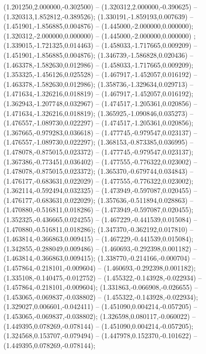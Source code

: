  (1.201250,2.000000,-0.302500) -- (1.320312,2.000000,-0.390625) -- (1.320313,1.852812,-0.389526);
 (1.330191,-1.859193,0.007639) -- (1.451901,-1.856885,0.004876) -- (1.445000,-2.000000,0.000000);
 (1.320312,-2.000000,0.000000) -- (1.445000,-2.000000,0.000000) ;
 (1.339015,-1.721325,0.014463) -- (1.458033,-1.717665,0.009209) -- (1.451901,-1.856885,0.004876);
 (1.346739,-1.586828,0.020436) -- (1.463378,-1.582630,0.012986) -- (1.458033,-1.717665,0.009209);
 (1.353325,-1.456126,0.025528) -- (1.467917,-1.452057,0.016192) -- (1.463378,-1.582630,0.012986);
 (1.358736,-1.329634,0.029713) -- (1.471634,-1.326216,0.018819) -- (1.467917,-1.452057,0.016192);
 (1.362943,-1.207748,0.032967) -- (1.474517,-1.205361,0.020856) -- (1.471634,-1.326216,0.018819);
 (1.365925,-1.090846,0.035273) -- (1.476557,-1.089730,0.022297) -- (1.474517,-1.205361,0.020856);
 (1.367665,-0.979283,0.036618) -- (1.477745,-0.979547,0.023137) -- (1.476557,-1.089730,0.022297);
 (1.368153,-0.873385,0.036995) -- (1.478078,-0.875015,0.023372) -- (1.477745,-0.979547,0.023137);
 (1.367386,-0.773451,0.036402) -- (1.477555,-0.776322,0.023002) -- (1.478078,-0.875015,0.023372);
 (1.365370,-0.679744,0.034843) -- (1.476177,-0.683631,0.022029) -- (1.477555,-0.776322,0.023002);
 (1.362114,-0.592494,0.032325) -- (1.473949,-0.597087,0.020455) -- (1.476177,-0.683631,0.022029);
 (1.357636,-0.511894,0.028863) -- (1.470880,-0.516811,0.018286) -- (1.473949,-0.597087,0.020455);
 (1.352325,-0.436665,0.024255) -- (1.467229,-0.441539,0.015084) -- (1.470880,-0.516811,0.018286);
 (1.347370,-0.362192,0.017810) -- (1.463814,-0.366863,0.009415) -- (1.467229,-0.441539,0.015084);
 (1.342855,-0.288049,0.009486) -- (1.460693,-0.292398,0.001182) -- (1.463814,-0.366863,0.009415);
 (1.338770,-0.214166,-0.000704) -- (1.457864,-0.218101,-0.009604) -- (1.460693,-0.292398,0.001182);
 (1.335108,-0.140475,-0.012752) -- (1.455322,-0.143928,-0.022934) -- (1.457864,-0.218101,-0.009604);
 (1.331863,-0.066908,-0.026655) -- (1.453065,-0.069837,-0.038802) -- (1.455322,-0.143928,-0.022934);
 (1.329027,0.006601,-0.042411) -- (1.451090,0.004214,-0.057205) -- (1.453065,-0.069837,-0.038802);
 (1.326598,0.080117,-0.060022) -- (1.449395,0.078269,-0.078144) -- (1.451090,0.004214,-0.057205);
 (1.324568,0.153707,-0.079494) -- (1.447978,0.152370,-0.101622) -- (1.449395,0.078269,-0.078144);
